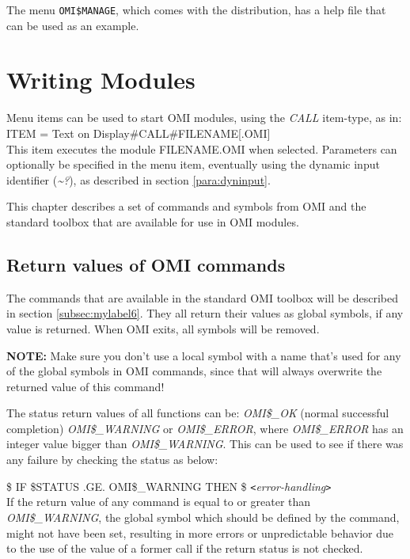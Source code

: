 \documentclass[a4paper]{book}
\newcommand{\vs}{\vspace{3mm}}
\newcommand{\lt}{\texttt{<}}
\newcommand{\gt}{\texttt{>}}
\begin{document}
\vs

The menu \texttt{OMI{\$}MANAGE}, which comes with the distribution,
has a help file that can be used as an example.

\chapter{Writing Modules}
\label{sec:writing}

Menu items can be used to start OMI modules, using the \textsl{CALL} item-type, as 
in: \\
\noindent\textsf{ITEM = Text on Display{\#}CALL{\#}FILENAME[.OMI]} \\
This item executes the module FILENAME.OMI when selected. Parameters can 
optionally be specified in the menu item, eventually using the dynamic input 
identifier (\textsl{\~{}?}), as described in section \ref{para:dyninput}.

\vs

This chapter describes a set of commands and symbols from OMI and the 
standard toolbox that are available for use in OMI modules.

\section{Return values of OMI commands}
\label{subsec:return}

The commands that are available in the standard OMI toolbox will be 
described in section \ref{subsec:mylabel6}. They all return their values as global symbols, if 
any value is returned. When OMI exits, all symbols will be removed.

\vs

\hspace{-8mm}\textbf{NOTE:} Make sure you don't use a local symbol with a name that's 
used for any of the global symbols in OMI commands, since that will always 
overwrite the returned value of this command!

The status return values of all functions can be:
\textsl{OMI{\$}{\_}OK} (normal successful completion)
\textsl{OMI{\$}{\_}WARNING} or \textsl{OMI{\$}{\_}ERROR}, where 
\textsl{OMI{\$}{\_}ERROR} has an integer value bigger than 
\textsl{OMI{\$}{\_}WARNING}. This can be used to see 
if there was any failure by checking the status as below:

\textsf{{\$} IF {\$}STATUS .GE. OMI{\$}{\_}WARNING THEN {\$} \lt \textit{error-handling}\gt} \\
If the return value of any command is equal to or greater than 
\textsl{OMI{\$}{\_}WARNING}, the global symbol which should be defined by the 
command, might not have been set, resulting in more errors or unpredictable 
behavior due to the use of the value of a former call if the return status 
is not checked.
\end{document}
